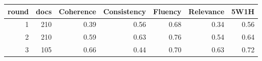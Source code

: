 \begin{tabular}{rrrrrrr}
\toprule
round & docs & Coherence & Consistency & Fluency & Relevance & 5W1H \\
\midrule
1 & 210 & 0.39 & 0.56 & 0.68 & 0.34 & 0.56 \\
2 & 210 & 0.59 & 0.63 & 0.76 & 0.54 & 0.64 \\
3 & 105 & 0.66 & 0.44 & 0.70 & 0.63 & 0.72 \\
\bottomrule
\end{tabular}
